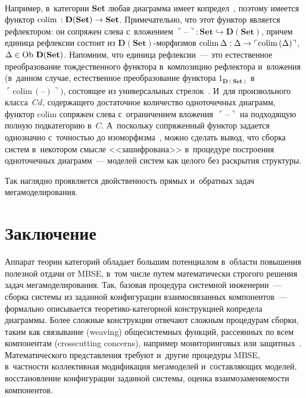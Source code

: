 \begin{multicols}{2}
\vspace*{1pt}
\begin{center}
\mbox{%
\epsfxsize=56.127mm
}
\end{center}

   Например, в~категории \textbf{Set} любая диаграмма имеет 
копредел~\cite[упражнение~5.1.8]{14-kov}, поэтому имеется функтор $\mathrm{colim}\, : 
\mathbf{D}(\mathbf{Set})\hm\to \mathbf{Set}$. Примечательно, что этот функтор 
является рефлектором: он сопряжен слева с~вложением $\ulcorner \mbox{--}\urcorner : 
\mathbf{Set}\hookrightarrow \mathbf{D}(\mathbf{Set})$, причем 
единица рефлексии состоит из $\mathbf{D}(\mathbf{Set})$-мор\-физ\-мов 
$\mathrm{colim}\,\Delta : \Delta\hm\to \ulcorner\mathrm{colim}\,(\Delta)\urcorner$, 
$\Delta\hm\in \mathrm{Ob}\ \mathbf{D}(\mathbf{Set})$. Напомним, что единица 
рефлексии~--- это естественное преобразование тождественного функтора 
в~композицию рефлектора и~вложения (в~данном случае, естественное 
преобразование функтора $1_{\mathbf{D}(\mathbf{Set})}$ в~$\ulcorner \mathrm{colim}\,(  
\mbox{--})\urcorner)$, состоящее из универсальных  
стрелок~\cite[разд.~4.3]{14-kov}. И~для произвольного класса~$Cd$, 
содержащего достаточное количество одноточечных диаграмм, функтор 
$\mathrm{colim}$ сопряжен слева с~ограничением  
вложения~$\ulcorner \mbox{--}\urcorner$ на подходящую полную подкатегорию 
в~$C$. А~поскольку сопряженный функтор задается однозначно с~точностью 
до изоморфизма~\cite[разд.~4.1]{14-kov}, можно сделать вывод, что сборка 
систем в~некотором смысле <<зашифрована>> в~процедуре построения 
одноточечных диаграмм~--- моделей систем как целого без раскрытия 
струк\-туры. 

Так наглядно проявляется двойственность прямых и~обратных задач 
мегамоделирования.

\section{Заключение}

   Аппарат теории категорий обладает большим потенциалом в~области 
повышения полезной отдачи от MBSE, в~том числе путем математически 
строгого решения задач мегамоделирования. Так, базовая процедура системной 
инженерии~--- сборка\linebreak
 системы из заданной конфигурации взаимо\-свя\-занных 
компонентов~--- формально описывается тео\-ретико-ка\-те\-гор\-ной 
конструкцией копредела диа\-граммы. Более сложные конструкции отвечают\linebreak 
сложным процедурам сборки, таким как связывание (weaving) общесистемных 
функций, рассеянных по всем компонентам (crosscutting concerns), например 
мониторинговых или защитных~\cite{16-kov}. Математического представления 
требуют и~другие процедуры MBSE, в~частности коллективная модификация 
мегамоделей и~составляющих моделей, восстановление конфигурации заданной 
системы, оценка взаимозаменяемости компонентов. 


\end{multicols}
